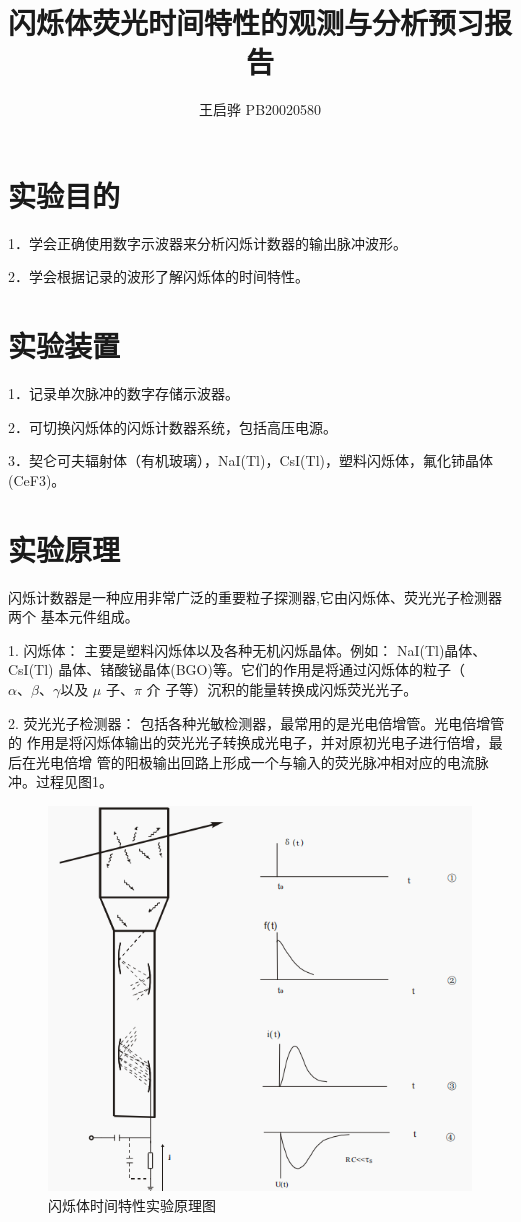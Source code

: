 \documentclass{article}
\title{\songti \zihao{2}\bfseries 闪烁体荧光时间特性的观测与分析预习报告}
\author{王启骅 PB20020580}
\begin{document}
	\maketitle
	\section{实验目的}
	1．学会正确使用数字示波器来分析闪烁计数器的输出脉冲波形。
	
	
	2．学会根据记录的波形了解闪烁体的时间特性。
	
	\section{实验装置}
	1．记录单次脉冲的数字存储示波器。
	
	
	2．可切换闪烁体的闪烁计数器系统，包括高压电源。
	
	
	3．契仑可夫辐射体（有机玻璃），NaI(Tl)，CsI(Tl)，塑料闪烁体，氟化铈晶体(CeF3)。
	
	\section{实验原理}
	闪烁计数器是一种应用非常广泛的重要粒子探测器,它由闪烁体、荧光光子检测器两个
	基本元件组成。
	
	
	1. 闪烁体： 主要是塑料闪烁体以及各种无机闪烁晶体。例如： NaI(Tl)晶体、CsI(Tl)
	晶体、锗酸铋晶体(BGO)等。它们的作用是将通过闪烁体的粒子（$ \alpha、\beta、\gamma  $以及 $ \mu $ 子、$\pi$ 介
	子等）沉积的能量转换成闪烁荧光光子。
	
	
	2. 荧光光子检测器： 包括各种光敏检测器，最常用的是光电倍增管。光电倍增管的
	作用是将闪烁体输出的荧光光子转换成光电子，并对原初光电子进行倍增，最后在光电倍增
	管的阳极输出回路上形成一个与输入的荧光脉冲相对应的电流脉冲。过程见图1。
	
	\begin{figure}[!h]
		
		\centering
		\includegraphics[scale=0.7]{原理}
		\caption{\heiti{}闪烁体时间特性实验原理图}
		
	\end{figure}
	
\end{document}
